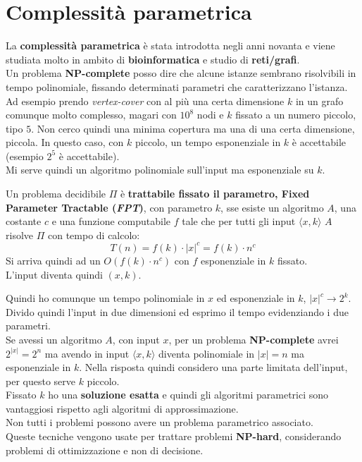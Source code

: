 \documentclass[a4paper,12pt, oneside]{book}
\begin{document}
\section{Complessità parametrica}
La \textbf{complessità parametrica} è stata introdotta negli anni novanta e
viene studiata molto in ambito di \textbf{bioinformatica} e studio di
\textbf{reti/grafi}.\\
Un problema \textbf{NP-complete} posso dire che alcune istanze sembrano
risolvibili in tempo polinomiale, fissando determinati parametri che
caratterizzano l'istanza. Ad esempio prendo \textit{vertex-cover} con al più una
certa dimensione $k$ in un grafo comunque molto complesso, magari con $10^8$
nodi e $k$ fissato a un numero piccolo, tipo $5$. Non cerco quindi una minima
copertura ma una di una certa dimensione, piccola. In questo caso, con $k$
piccolo, un tempo esponenziale in $k$ è accettabile (esempio $2^5$ è
accettabile).\\
Mi serve quindi un algoritmo polinomiale sull'input ma esponenziale su $k$.
\begin{definizione}
  Un problema decidibile $\Pi$ è \textbf{trattabile fissato il parametro, Fixed
    Parameter Tractable (\textit{FPT})}, con parametro $k$, sse esiste un
  algoritmo $A$, una costante $c$ e una funzione computabile $f$ tale che per
  tutti gli input $\langle x,k\rangle$ $A$ risolve $\Pi$ con tempo di calcolo:
  \[T(n) = f(k)\cdot|x|^c=f(k)\cdot n^c\]
  Si arriva quindi ad un $O(f(k)\cdot n^c)$ con $f$ esponenziale in $k$
  fissato. \\
  L'input diventa quindi $(x,k)$.
\end{definizione}
Quindi ho comunque un tempo polinomiale in $x$ ed esponenziale in $k$, $|x|^c\to
2^k$. Divido quindi l'input in due dimensioni ed esprimo il tempo evidenziando
i due parametri.\\
Se avessi un algoritmo $A$, con input $x$, per un problema \textbf{NP-complete}
avrei $2^{|x|}=2^n$ ma avendo in input $\langle x,k\rangle$ diventa polinomiale
in $|x|=n$ ma esponenziale in $k$. Nella risposta quindi considero una parte
limitata dell'input, per questo serve $k$ piccolo.\\
Fissato $k$ ho una \textbf{soluzione esatta} e quindi gli algoritmi parametrici
sono vantaggiosi rispetto agli algoritmi di approssimazione.\\
Non tutti i problemi possono avere un problema parametrico associato.\\
Queste tecniche vengono usate per trattare problemi \textbf{NP-hard},
considerando problemi di ottimizzazione e non di decisione.
\end{document}
